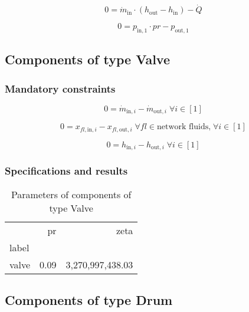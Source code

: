 \begin{equation}
\label{eq:HeatExchangerSimple_Q}
0 = \dot{m}_\mathrm{in} \cdot \left(h_\mathrm{out} - h_\mathrm{in} \right) -\dot{Q}
\end{equation}

\begin{equation}
\label{eq:HeatExchangerSimple_pr}
0=p_\mathrm{in,1}\cdot pr - p_\mathrm{out,1}
\end{equation}


\subsection{Components of type Valve}

\subsubsection{Mandatory constraints}

\begin{equation}
\label{eq:Valve_mass_flow_constraints}
0=\dot{m}_{\mathrm{in,}i}-\dot{m}_{\mathrm{out,}i}\; \forall i \in [1]
\end{equation}

\begin{equation}
\label{eq:Valve_fluid_constraints}
0=x_{fl\mathrm{,in,}i}-x_{fl\mathrm{,out,}i}\;\forall fl \in\text{network fluids,}\; \forall i \in [1]
\end{equation}

\begin{equation}
\label{eq:Valve_enthalpy_equality_constraints}
0=h_{\mathrm{in,}i}-h_{\mathrm{out,}i}\; \forall i \in [1]
\end{equation}


\subsubsection{Specifications and results}

\begin{table}[H]
\centering
\caption{Parameters of components of type Valve}
\begin{tabular}{lrr}
\toprule
{} &    pr &              zeta \\
label &       &                   \\
\midrule
valve &  0.09 &  3,270,997,438.03 \\
\bottomrule
\end{tabular}
\end{table}
\subsection{Components of type Drum}

